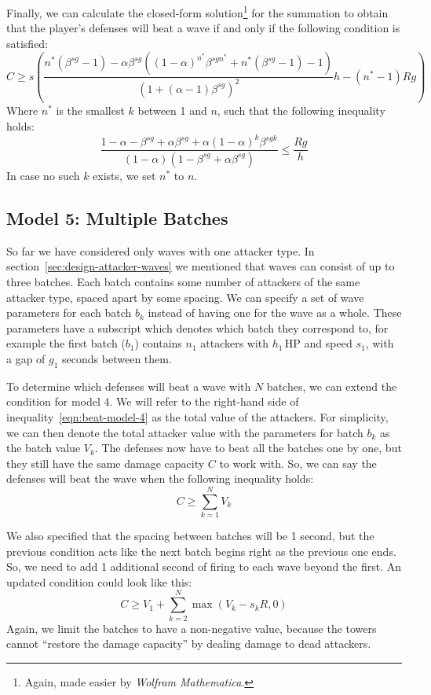 Finally, we can calculate the closed-form solution\footnote{Again, made easier by \emph{Wolfram Mathematica}.} for the summation to obtain that the player's defenses will beat a wave if and only if the following condition is satisfied:
\begin{equation}\label{eqn:beat-model-4}
    C \geq s\left(\frac{
    n^*(\beta^{sg}-1) - \alpha\beta^{sg}((1-\alpha)^{n^*}\beta^{sgn^*} + n^*(\beta^{sg}-1) - 1)
    }{
        (1+(\alpha-1)\beta^{sg})^2
    }h
    - (n^*-1)Rg
    \right)
\end{equation}
Where $n^*$ is the smallest $k$ between 1 and $n$, such that the following inequality holds:
\begin{equation}
    \frac{
        1-\alpha-\beta^{sg}+\alpha\beta^{sg}+\alpha(1-\alpha)^k\beta^{sgk}
    }{
        (1-\alpha)(1-\beta^{sg}+\alpha\beta^{sg})
    } \leq \frac{Rg}{h}
\end{equation}
In case no such $k$ exists, we set $n^*$ to $n$.

\subsection{Model 5: Multiple Batches}
So far we have considered only waves with one attacker type.
In section~\ref{sec:design-attacker-waves} we mentioned that waves can consist of up to three batches.
Each batch contains some number of attackers of the same attacker type, spaced apart by some spacing.
We can specify a set of wave parameters for each batch $b_k$ instead of having one for the wave as a whole.
These parameters have a subscript which denotes which batch they correspond to, for example the first batch ($b_1$) contains $n_1$ attackers with $h_1$\,HP and speed $s_1$, with a gap of $g_1$ seconds between them.

To determine which defenses will beat a wave with $N$ batches, we can extend the condition for model 4.
We will refer to the right-hand side of inequality~\ref{eqn:beat-model-4} as the total value of the attackers.
For simplicity, we can then denote the total attacker value with the parameters for batch $b_k$ as the batch value $V_k$.
The defenses now have to beat all the batches one by one, but they still have the same damage capacity $C$ to work with.
So, we can say the defenses will beat the wave when the following inequality holds:
\begin{equation}
    C \geq \sum_{k=1}^{N} V_k
\end{equation}

We also specified that the spacing between batches will be 1 second, but the previous condition acts like the next batch begins right as the previous one ends.
So, we need to add 1 additional second of firing to each wave beyond the first.
An updated condition could look like this:
\begin{equation}
    C \geq V_1 +\sum_{k=2}^{N} \max(V_k - s_kR, 0)
\end{equation}
Again, we limit the batches to have a non-negative value, because the towers cannot \enquote{restore the damage capacity} by dealing damage to dead attackers.

